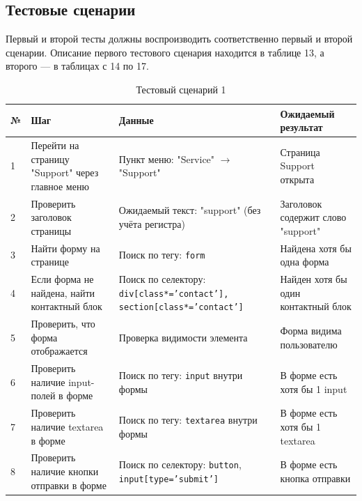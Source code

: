 \documentclass{article}[14pt]
\begin{document}
\subsection{Тестовые сценарии}

Первый и второй тесты должны воспроизводить соответственно первый и второй сценарии. Описание первого тестового сценария находится в таблице 13, а второго — в таблицах с 14 по 17.

\begin{table}[H]
\centering
\caption{Тестовый сценарий 1}
\label{tab:test_scenario_1}
\renewcommand{\arraystretch}{1.5}
\begin{tabular}{|l|p{3.5cm}|p{4cm}|p{4cm}|}
\hline
\textbf{№} & \textbf{Шаг} & \textbf{Данные} & \textbf{Ожидаемый результат} \\ \hline
1 & Перейти на страницу "Support" через главное меню & Пункт меню: "Service" $\rightarrow$ "Support" & Страница Support открыта \\ \hline
2 & Проверить заголовок страницы & Ожидаемый текст: "support" (без учёта регистра) & Заголовок содержит слово "support" \\ \hline
3 & Найти форму на странице & Поиск по тегу: \texttt{form} & Найдена хотя бы одна форма \\ \hline
4 & Если форма не найдена, найти контактный блок & Поиск по селектору: \texttt{div[class*='contact'], section[class*='contact']} & Найден хотя бы один контактный блок \\ \hline
5 & Проверить, что форма отображается & Проверка видимости элемента & Форма видима пользователю \\ \hline
6 & Проверить наличие input-полей в форме & Поиск по тегу: \texttt{input} внутри формы & В форме есть хотя бы 1 input \\ \hline
7 & Проверить наличие textarea в форме & Поиск по тегу: \texttt{textarea} внутри формы & В форме есть хотя бы 1 textarea \\ \hline
8 & Проверить наличие кнопки отправки в форме & Поиск по селектору: \texttt{button}, \texttt{input[type='submit']} & В форме есть кнопка отправки \\ \hline
\end{tabular}
\end{table}
\end{document}
